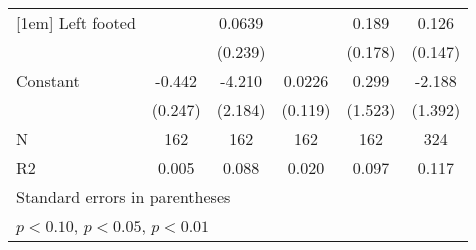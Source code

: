 {\begin{tabular}{l*{5}{c}}
[1em]
Left footed         &                     &      0.0639         &                     &       0.189         &       0.126         \\
                    &                     &     (0.239)         &                     &     (0.178)         &     (0.147)         \\
[1em]
Constant            &      -0.442\sym{*}  &      -4.210\sym{*}  &      0.0226         &       0.299         &      -2.188         \\
                    &     (0.247)         &     (2.184)         &     (0.119)         &     (1.523)         &     (1.392)         \\
\hline
N                   &         162         &         162         &         162         &         162         &         324         \\
R2                  &       0.005         &       0.088         &       0.020         &       0.097         &       0.117         \\
\hline\hline
\multicolumn{6}{l}{\footnotesize Standard errors in parentheses}\\
\multicolumn{6}{l}{\footnotesize \sym{*} \(p<0.10\), \sym{**} \(p<0.05\), \sym{***} \(p<0.01\)}\\
\end{tabular}
}
